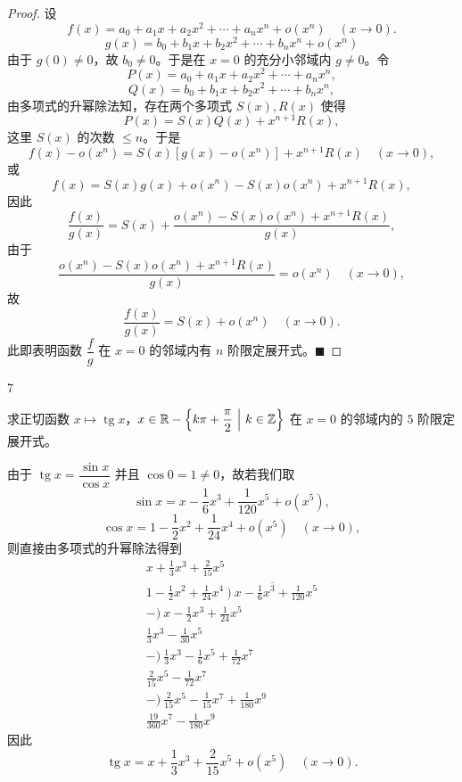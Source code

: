 \begin{proof}

设
\[f(x)=a_0+a_1x+a_2x^2+\cdots+a_nx^n+o(x^n)\quad(x\to0).\]
\[g(x)=b_0+b_1x+b_2x^2+\cdots+b_nx^n+o(x^n)\]
由于 $g(0)\neq0$，故 $b_0\neq0$。于是在 $x=0$ 的充分小邻域内 $g\neq0$。令
\[P(x)=a_0+a_1x+a_2x^2+\cdots+a_nx^n,\]
\[Q(x)=b_0+b_1x+b_2x^2+\cdots+b_nx^n,\]
由多项式的升幂除法知，存在两个多项式 $S(x),R(x)$ 使得
\[P(x)=S(x)Q(x)+x^{n+1}R(x),\]
这里 $S(x)$ 的次数 $\leqslant n$。于是
\[f(x)-o(x^n)=S(x)[g(x)-o(x^n)]+x^{n+1}R(x)\quad(x\to0),\]
或
\[f(x)=S(x)g(x)+o(x^n)-S(x)o(x^n)+x^{n+1}R(x),\]
因此
\[\frac{f(x)}{g(x)}=S(x)+\frac{o(x^n)-S(x)o(x^n)+x^{n+1}R(x)}{g(x)},\]
由于
\[\frac{o(x^n)-S(x)o(x^n)+x^{n+1}R(x)}{g(x)}=o(x^n)\quad(x\to0),\]
故
\[\frac{f(x)}{g(x)}=S(x)+o(x^n)\quad(x\to0).\]
此即表明函数 $\dfrac{f}{g}$ 在 $x=0$ 的邻域内有 $n$ 阶限定展开式。$\blacksquare$

\end{proof}

\begin{sourceexample}{7}

求正切函数 $x\longmapsto\operatorname{tg}x$，$x\in\R-\left\{k\pi+\dfrac{\pi}{2}\ \middle|\ k\in\Z\right\}$ 在 $x=0$ 的邻域内的 $5$ 阶限定展开式。

由于 $\operatorname{tg}x=\dfrac{\sin x}{\cos x}$ 并且 $\cos0=1\neq0$，故若我们取
\[\sin x=x-\frac{1}{6}x^{3}+\frac{1}{120}x^{5}+o(x^{5}),\]
\[\cos x=1-\frac{1}{2}x^{2}+\frac{1}{24}x^{4}+o(x^{5})\quad(x\to0),\]
则直接由多项式的升幂除法得到
\[\begin{array}{r}
x+\frac{1}{3}x^{3}+\frac{2}{15}x^{5} \\
1-\frac{1}{2}x^{2}+\frac{1}{24}x^{4}\ \overline{\big)\ x-\frac{1}{6}x^{3}+\frac{1}{120}x^{5}} \\
-\big)\ x-\frac{1}{2}x^{3}+\frac{1}{24}x^{5} \\
\hline
\frac{1}{3}x^{3}-\frac{1}{30}x^{5} \\
-\big)\ \frac{1}{3}x^{3}-\frac{1}{6}x^{5}+\frac{1}{72}x^{7} \\
\hline
\frac{2}{15}x^{5}-\frac{1}{72}x^{7} \\
-\big)\ \frac{2}{15}x^{5}-\frac{1}{15}x^{7}+\frac{1}{180}x^{9} \\
\hline
\frac{19}{360}x^{7}-\frac{1}{180}x^{9}
\end{array}\]
因此
\[\operatorname{tg}x=x+\frac{1}{3}x^3+\frac{2}{15}x^5+o(x^5)\quad(x\to0).\]

\end{sourceexample}

